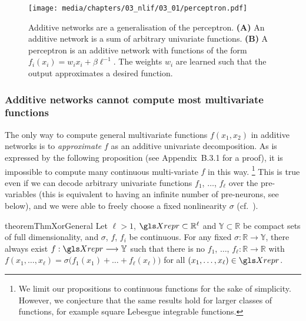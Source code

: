 \begin{figure}
	\centering
	\texttt{[image: media/chapters/03\_nlif/03\_01/perceptron.pdf]}%
	{\label{fig:perceptron_a}}%
	{\label{fig:perceptron_b}}%
	\caption[Additive networks are a generalisation of the perceptron]{Additive networks are a generalisation of the perceptron. \textbf{(A)} An additive network is a sum of arbitrary univariate functions. \textbf{(B)} A perceptron is an additive network with functions of the form $f_i(x_i) = w_i x_i + \beta \ell^{-1}$. The weights $w_i$ are learned such that the output approximates a desired function.}
\end{figure}

\subsubsection{Additive networks cannot compute most multivariate functions}
The only way to compute general multivariate functions $f(x_1, x_2)$ in additive networks is to \emph{approximate} $f$ as an additive univariate decomposition.
As is expressed by the following proposition (see Appendix~B.3.1 for a proof), it is impossible to compute many continuous multi-variate $f$ in this way.%
\footnote{We limit our propositions to continuous functions for the sake of simplicity.
However, we conjecture that the same results hold for larger classes of functions, for example square Lebesgue integrable functions.}
This is true even if we can decode arbitrary univariate functions $f_1$, $\ldots$, $f_\ell$ over the pre-variables (this is equivalent to having an infinite number of pre-neurons, see below), and we were able to freely choose a fixed nonlinearity $\sigma$ (cf.~).

\begin{restatable}{theorem}{ThmXorGeneral}
\label{thm:xor_general}
Let $\ell > 1$, $\Xrepr \subset \mathbb{R}^\ell$ and $\mathbb{Y} \subset \mathbb{R}$ be compact sets of full dimensionality, and $\sigma$, $f$, $f_i$ be continuous.
For any fixed $\sigma : \mathbb{R} \longrightarrow \mathbb{Y}$, there always exist $f : \Xrepr \longrightarrow \mathbb{Y}$ such that there is no $f_1$, $\ldots$, $f_\ell : \mathbb{R}  \longrightarrow \mathbb{R}$ with
$f(x_1, \ldots, x_\ell) = \sigma\bigl( f_1(x_1) + \ldots + f_\ell(x_\ell) \bigr)$ for all $(x_1, \ldots, x_\ell) \in \Xrepr$.
\end{restatable}


